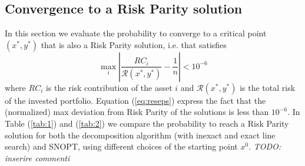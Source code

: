 \subsection{Convergence to a Risk Parity solution}
In this section we evaluate the probability to converge to a critical point $(x^*,y^*)$ that is also a Risk Parity solution, i.e. that satisfies 
\begin{equation}\label{eq:reseps}
\max_i \left| \frac{RC_i}{\mathcal{R}(x^*,y^*)} - \frac{1}{n} \right| < 10^{-6}
\end{equation}
where $RC_i$ is the risk contribution of the asset $i$ and ${\mathcal{R}(x^*,y^*)}$ is the total risk of the invested portfolio. Equation (\ref{eq:reseps}) express the fact that the (normalized) max deviation from Risk Parity of the solutions is less than $10^{-6}$. In Table (\ref{tab:1}) and (\ref{tab:2}) we compare the probability to reach a Risk Parity solution for both the decomposition algorithm (with inexact and exact line search) and SNOPT, using different choices of the starting point $x^0$. \textit{TODO: inserire commenti}
